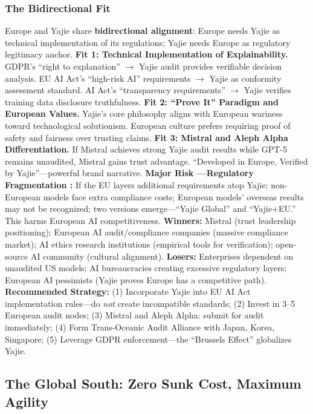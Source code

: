 \documentclass[11pt,a4paper]{article}
\theoremstyle{definition}
\theoremstyle{remark}
\begin{document}
\subsubsection{The Bidirectional Fit }
Europe and Yajie share \textbf{bidirectional alignment}: Europe needs Yajie as technical implementation of its regulations; Yajie needs Europe as regulatory legitimacy anchor.
\textbf{Fit 1: Technical Implementation of Explainability.} GDPR's ``right to explanation'' $\to$ Yajie audit provides verifiable decision analysis. EU AI Act's ``high-risk AI'' requirements $\to$ Yajie as conformity assessment standard. AI Act's ``transparency requirements'' $\to$ Yajie verifies training data disclosure truthfulness.
\textbf{Fit 2: ``Prove It'' Paradigm and European Values.} Yajie's core philosophy aligns with European wariness toward technological solutionism. European culture prefers requiring proof of safety and fairness over trusting claims.
\textbf{Fit 3: Mistral and Aleph Alpha Differentiation.} If Mistral achieves strong Yajie audit results while GPT-5 remains unaudited, Mistral gains trust advantage. ``Developed in Europe, Verified by Yajie''---powerful brand narrative.
\textbf{Major Risk ---Regulatory Fragmentation :}
If the EU layers additional requirements atop Yajie: non-European models face extra compliance costs; European models' overseas results may not be recognized; two versions emerge---``Yajie Global'' and ``Yajie+EU.'' This harms European AI competitiveness.
\textbf{Winners:} Mistral (trust leadership positioning); European AI audit/compliance companies (massive compliance market); AI ethics research institutions (empirical tools for verification); open-source AI community (cultural alignment).
\textbf{Losers:} Enterprises dependent on unaudited US models; AI bureaucracies creating excessive regulatory layers; European AI pessimists (Yajie proves Europe has a competitive path).
\textbf{Recommended Strategy:} (1) Incorporate Yajie into EU AI Act implementation rules---do \textit{not} create incompatible standards; (2) Invest in 3--5 European audit nodes; (3) Mistral and Aleph Alpha: submit for audit immediately; (4) Form Trans-Oceanic Audit Alliance with Japan, Korea, Singapore; (5) Leverage GDPR enforcement---the ``Brussels Effect'' globalizes Yajie.
\subsection{The Global South: Zero Sunk Cost, Maximum Agility}
\label{sec:global_south}
\end{document}
